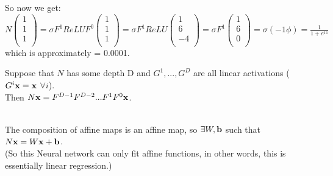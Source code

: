 \begin{example}
    So now we get:\\
    $N\begin{pmatrix}
    1\\
    1\\
    1\\
    \end{pmatrix} = \sigma F^{1}ReLUF^{0} \begin{pmatrix}
        1\\
        1\\
        1\\
    \end{pmatrix} = \sigma F^{1}ReLU \begin{pmatrix}
    1\\
    6\\
    -4\\
    \end{pmatrix} = \sigma  F^{1} \begin{pmatrix}
    1\\
    6\\
    0\\
    \end{pmatrix} = \sigma(-1\phi) = \frac{1}{1+e^{11}}$ which is approximately = 0.0001.
           
        
\end{example}

\begin{example}
Suppose that $N$ has some depth D and $G^{1},...,G^{D}$ are all linear activations ($G^{i}{\vx} = {\vx}$ $\forall i$).\\
Then $N{\vx} = F^{D-1}F^{D-2}...F^{1}F^{0}{\vx}$.\\
    \begin{remark}\\
        The composition of affine maps is an affine map, so $\exists W, {\vb}$ such that\\
            $N{\vx} = W{\vx} + {\vb}$.\\
            (So this Neural network can only fit affine functions, in other words, this is essentially linear regression.)
    \end{remark}
\end{example}

